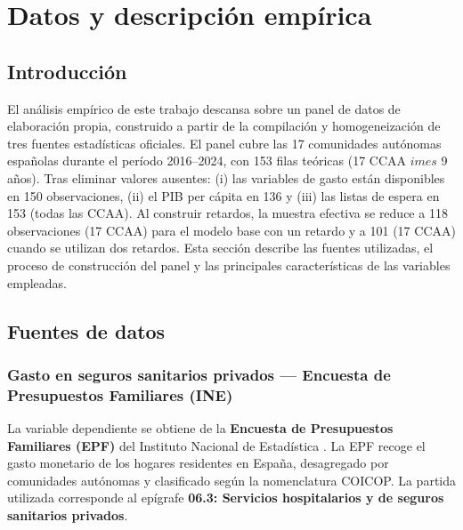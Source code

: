 \chapter{Datos y descripción empírica}
\label{cap:datos}

\section{Introducción}

El análisis empírico de este trabajo descansa sobre un panel de datos de
elaboración propia, construido a partir de la compilación y homogeneización de
tres fuentes estadísticas oficiales. El panel cubre las 17 comunidades autónomas
españolas durante el período 2016--2024, con 153 filas teóricas (17 CCAA $	imes$
9 años). Tras eliminar valores ausentes: (i) las variables de gasto están
disponibles en 150 observaciones, (ii) el PIB per cápita en 136 y (iii) las
listas de espera en 153 (todas las CCAA). Al construir retardos, la muestra
efectiva se reduce a 118 observaciones (17 CCAA) para el modelo base con un
retardo y a 101 (17 CCAA) cuando se utilizan dos retardos. Esta sección describe las fuentes utilizadas, el
proceso de construcción del panel y las principales características de las
variables empleadas.

\section{Fuentes de datos}

\subsection{Gasto en seguros sanitarios privados --- Encuesta de Presupuestos
Familiares (INE)}

La variable dependiente se obtiene de la \textbf{Encuesta de Presupuestos
Familiares (EPF)} del Instituto Nacional de Estadística \parencite{INE_EPF}. La
EPF recoge el gasto monetario de los hogares residentes en España, desagregado por
comunidades autónomas y clasificado según la nomenclatura COICOP. La partida
utilizada corresponde al epígrafe \textbf{06.3: Servicios hospitalarios y de
seguros sanitarios privados}.

